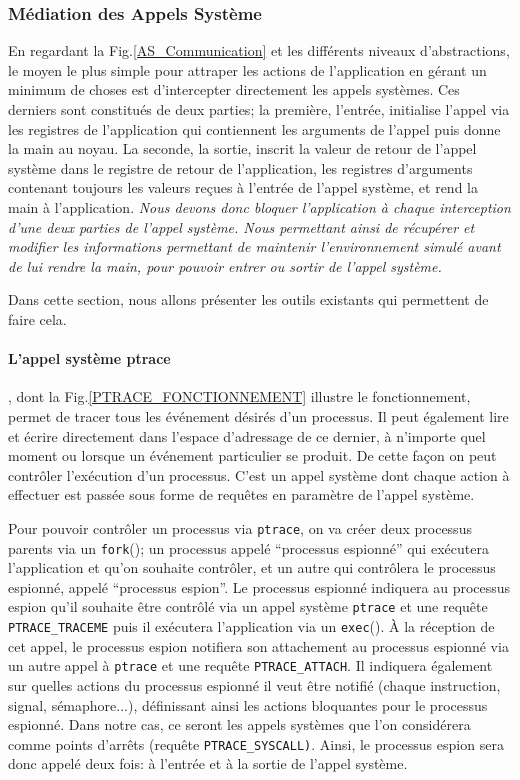 \subsubsection{Médiation des Appels Système}

En regardant la Fig.\ref{AS_Communication} et les différents niveaux
d'abstractions, le moyen le plus simple pour attraper les actions de
l'application en gérant un minimum de choses est d'intercepter directement les
appels systèmes.  Ces derniers sont constitués de deux parties; la première,
l'entrée, initialise l'appel via les registres de l'application qui contiennent
les arguments de l'appel puis donne la main au noyau. La seconde, la sortie,
inscrit la valeur de retour de l'appel système dans le registre de retour de
l'application, les registres d'arguments contenant toujours les valeurs reçues à
l'entrée de l'appel système, et rend la main à l'application. \textit{Nous
  devons donc bloquer l'application à chaque interception d'une deux parties de
  l'appel système. Nous permettant ainsi de récupérer et modifier les
  informations permettant de maintenir l'environnement simulé avant de lui
  rendre la main, pour pouvoir entrer ou sortir de l'appel système.}

 Dans cette section, nous allons présenter les outils existants qui permettent
 de faire cela.
 
 \paragraph{L'appel système ptrace}\citep{AS:Interception, MARION:Interception}
 , dont la Fig.\ref{PTRACE_FONCTIONNEMENT} illustre le fonctionnement, permet de
 tracer tous les événement désirés d'un processus. Il peut également lire et
 écrire directement dans l'espace d'adressage de ce dernier, à n'importe quel
 moment ou lorsque un événement particulier se produit. De cette façon on peut
 contrôler l'exécution d'un processus. C'est un appel système dont chaque action
 à effectuer est passée sous forme de requêtes en paramètre de l'appel système.

Pour pouvoir contrôler un processus via \texttt{ptrace}, on va créer deux
processus parents via un \texttt{fork}(); un processus appelé ``processus
espionné'' qui exécutera l'application et qu'on souhaite contrôler, et un autre
qui contrôlera le processus espionné, appelé ``processus espion''. Le processus
espionné indiquera au processus espion qu'il souhaite être contrôlé via un appel
système \texttt{ptrace} et une requête \texttt{PTRACE\_TRACEME} puis il
exécutera l'application via un \texttt{exec}(). À la réception de cet appel, le
processus espion notifiera son attachement au processus espionné via un autre
appel à \texttt{ptrace} et une requête \texttt{PTRACE\_ATTACH}. Il indiquera
également sur quelles actions du processus espionné il veut être notifié (chaque
instruction, signal, sémaphore...), définissant ainsi les actions bloquantes
pour le processus espionné. Dans notre cas, ce seront les appels systèmes que
l'on considérera comme points d'arrêts (requête
\texttt{PTRACE\_SYSCALL)}. Ainsi, le processus espion sera donc appelé deux
fois: à l'entrée et à la sortie de l'appel système.


